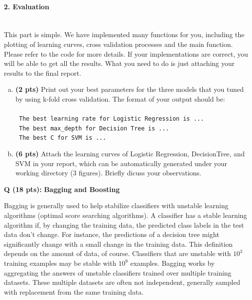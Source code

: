 \documentclass{article}
\newcounter{questionno}
\newcounter{partno}
\newcommand{\question}[1]{
\noindent
\newline
\stepcounter{questionno}
\setcounter{partno}{0}
{\bf \large Q\arabic{questionno} (#1 pts): }
}
\begin{document}
\paragraph{2. Evaluation}~\\

This part is simple. We have implemented many functions for you, including the plotting of learning curves, cross validation processes and the main function. Please refer to the code for more details. If your implementations are correct, you will be able to get all the results. What you need to do is just attaching your results to the final report.
\begin{enumerate}[(a)]
\item {\bf (2 pts)} Print out your best parameters for the three models that you tuned by using k-fold cross validation. The format of your output should be:\\ \\
    \texttt{
    The best learning rate for Logistic Regression is ...}\\
    \texttt{
    The best max\_depth for Decision Tree is ...}\\
    \texttt{
    The best C for SVM is ...}
 \begin{tcolorbox}[breakable,
enhanced,
notitle,
width=15.8cm,
height=5cm]  

\end{tcolorbox}

\item {\bf (6 pts)} Attach the learning curves of Logistic Regression, DecisionTree, and SVM in your report, which can be automatically generated under your working directory (3 figures). Briefly dicuss your observations.

 \begin{tcolorbox}[breakable,
enhanced,
notitle,
width=15.8cm,
height=24cm]  
\end{tcolorbox}

\end{enumerate}
\newpage
\question{18}{\bf \large Bagging and Boosting}

Bagging is generally used to help stabilize classifiers with unstable learning algorithms (optimal score searching algorithms). A classifier has a stable learning algorithm if, by changing the training data, the predicted class labels in the test data don't change. 
For instance, the predictions of a decision tree might significantly change with a small change in the training data. 
This definition depends on the amount of data, of course. Classifiers that are unstable with $10^3$ training examples may be stable with $10^{9}$ examples.
Bagging works by aggregating the answers of unstable classifiers trained over multiple training datasets. These multiple datasets are often not independent, generally sampled with replacement from the same training data. 
\end{document}

